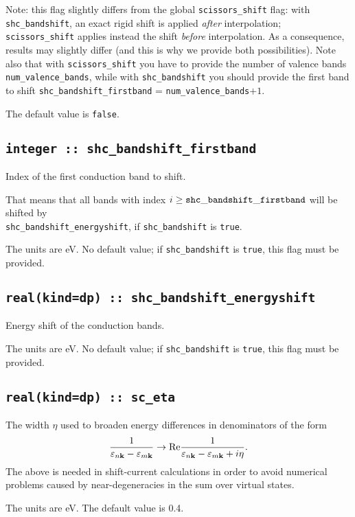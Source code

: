 Note: this flag slightly differs from the global {\tt scissors\_shift} flag: with {\tt shc\_bandshift}, an exact rigid shift is applied \emph{after} interpolation; {\tt scissors\_shift} applies instead the shift \emph{before} interpolation. As a consequence, results may slightly differ (and this is why we provide both possibilities). Note also that with {\tt scissors\_shift} you have to provide the number of valence bands {\tt num\_valence\_bands}, while with {\tt shc\_bandshift} you should provide the first band to shift {\tt shc\_bandshift\_firstband} = {\tt num\_valence\_bands}$+1$.

The default value is \verb#false#.

\subsection[shc\_bandshift\_firstband]{\tt integer :: shc\_bandshift\_firstband}
Index of the first conduction band to shift.

That means that all bands with index $i\ge {\tt shc\_bandshift\_firstband}$ will be shifted by  \\{\tt shc\_bandshift\_energyshift}, if {\tt shc\_bandshift} is \verb#true#.

The units are eV.
No default value; if {\tt shc\_bandshift} is \verb#true#, this flag must be provided.

\subsection[shc\_bandshift\_energyshift]{\tt real(kind=dp) :: shc\_bandshift\_energyshift}
Energy shift of the conduction bands.

The units are eV.
No default value; if {\tt shc\_bandshift} is \verb#true#, this flag must be provided.


\subsection{\tt real(kind=dp) :: sc\_eta}

The width $\eta$ used to broaden energy differences in denominators of the form 
%
$$
\frac{1}{\varepsilon_{n\bf{k}}-\varepsilon_{m\bf{k}}}\rightarrow
\text{Re}\frac{1}{\varepsilon_{n\bf{k}}-\varepsilon_{m\bf{k}}+i\eta}.
$$ 
%
The above is needed in shift-current calculations in order to avoid numerical problems
caused by near-degeneracies in the sum over virtual states. 

The units are eV. The default value is 0.4.


